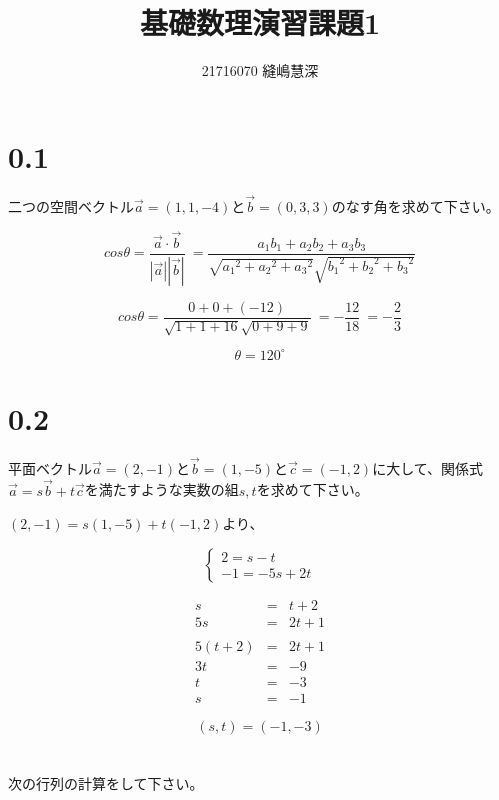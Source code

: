 \documentclass{jsarticle}
\title{基礎数理演習課題1}
\author{21716070 縫嶋慧深}
\begin{document}
	\maketitle

	\section*{0.1}
	二つの空間ベクトル$\overrightarrow{a}= (1, 1, -4)$と$\overrightarrow{b}= (0, 3, 3)$のなす角を求めて下さい。

	\[
		cos\theta
			= \frac {\overrightarrow{a} \cdot \overrightarrow{b}}
				{|\overrightarrow{a}| |\overrightarrow{b}|}\
			= \frac {a_1b_1+a_2b_2+a_3b_3}
				{\sqrt {{a_1}^2+{a_2}^2+{a_3}^2} \sqrt {{b_1}^2+{b_2}^2+{b_3}^2}}
	\]

	\[
		cos\theta
			= \frac {0 + 0 + (-12)} {\sqrt {1 + 1 + 16} \sqrt {0 + 9 + 9}}\
			= - \frac {12}{18}\
			= - \frac{2}{3}
	\]

	\[
		\theta = 120^\circ
	\]

	\section*{0.2}
	平面ベクトル$\overrightarrow{a}= (2, -1)$と$\overrightarrow{b}= (1, -5)$と$\overrightarrow{c}= (-1, 2)$に大して、関係式$\overrightarrow{a} = s\overrightarrow{b} + t\overrightarrow{c}$を満たすような実数の組$s, t$を求めて下さい。

	$(2, -1) = s(1, -5) + t(-1, 2)$より、

	\[
		\begin{cases}
			2 = s - t \\
			-1 = -5s + 2t
		\end{cases}
	\]

	\begin{eqnarray*}
		s &=& t + 2 \\
		5s &=& 2t + 1 \\
		\\
		5(t + 2) &=& 2t + 1 \\
		3t &=& -9 \\
		t &=& -3 \\
		s &=& -1
	\end{eqnarray*}

	\[
		(s, t) = (-1, -3)
	\]

	\section{}
	次の行列の計算をして下さい。
\end{document}
